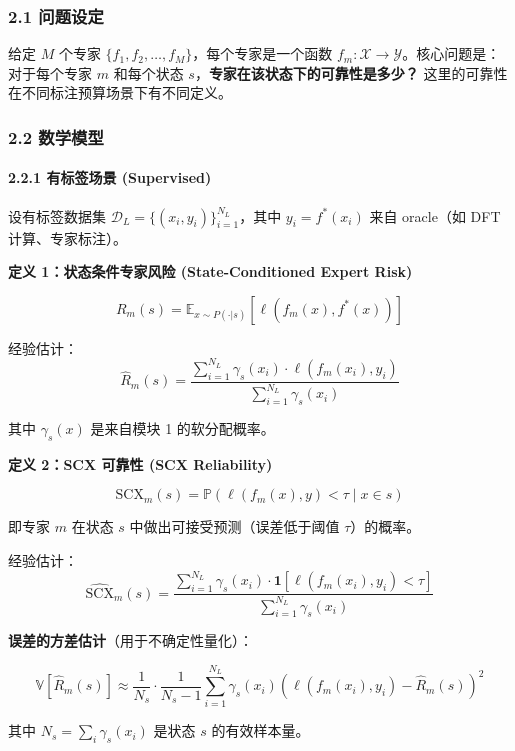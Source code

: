 \documentclass[
  12pt,
]{ctexart}
\begin{document}
\subsubsection{2.1 问题设定}\label{ux95eeux9898ux8bbeux5b9a-1}

给定 \(M\) 个专家 \(\{f_1, f_2, \dots, f_M\}\)，每个专家是一个函数
\(f_m: \mathcal{X} \to \mathcal{Y}\)。核心问题是：对于每个专家 \(m\)
和每个状态 \(s\)，\textbf{专家在该状态下的可靠性是多少？}
这里的可靠性在不同标注预算场景下有不同定义。

\subsubsection{2.2 数学模型}\label{ux6570ux5b66ux6a21ux578b-1}

\paragraph{2.2.1 有标签场景
(Supervised)}\label{ux6709ux6807ux7b7eux573aux666f-supervised}

设有标签数据集 \(\mathcal{D}_L = \{(x_i, y_i)\}_{i=1}^{N_L}\)，其中
\(y_i = f^*(x_i)\) 来自 oracle（如 DFT 计算、专家标注）。

\textbf{定义 1：状态条件专家风险 (State-Conditioned Expert Risk)}

\[
R_m(s) = \mathbb{E}_{x \sim P(\cdot|s)} [ \ell(f_m(x), f^*(x)) ]
\]

经验估计： \[
\hat{R}_m(s) = \frac{\sum_{i=1}^{N_L} \gamma_s(x_i) \cdot \ell(f_m(x_i), y_i)}{\sum_{i=1}^{N_L} \gamma_s(x_i)}
\]

其中 \(\gamma_s(x)\) 是来自模块 1 的软分配概率。

\textbf{定义 2：SCX 可靠性 (SCX Reliability)}

\[
\text{SCX}_m(s) = \mathbb{P}( \ell(f_m(x), y) < \tau \mid x \in s )
\]

即专家 \(m\) 在状态 \(s\) 中做出可接受预测（误差低于阈值
\(\tau\)）的概率。

经验估计： \[
\widehat{\text{SCX}}_m(s) = \frac{\sum_{i=1}^{N_L} \gamma_s(x_i) \cdot \mathbf{1}[\ell(f_m(x_i), y_i) < \tau]}{\sum_{i=1}^{N_L} \gamma_s(x_i)}
\]

\textbf{误差的方差估计}（用于不确定性量化）：

\[
\mathbb{V}[\hat{R}_m(s)] \approx \frac{1}{N_s} \cdot \frac{1}{N_s - 1} \sum_{i=1}^{N_L} \gamma_s(x_i) \left( \ell(f_m(x_i), y_i) - \hat{R}_m(s) \right)^2
\]

其中 \(N_s = \sum_i \gamma_s(x_i)\) 是状态 \(s\) 的有效样本量。
\end{document}

